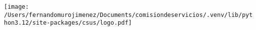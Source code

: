 \documentclass[a4paper,10pt]{article}
\begin{document}
\begin{minipage}{0.3\textwidth}
\texttt{[image:  /Users/fernandomurojimenez/Documents/comisiondeservicios/.venv/lib/python3.12/site-packages/csus/logo.pdf]}
\end{minipage}
\begin{minipage}{0.8\textwidth}
\begin{center}
\setlength{\fboxrule}{1pt}
\setlength{\fboxsep}{2mm}
\end{center}
\end{minipage}


\vspace{5mm}
\end{document}
